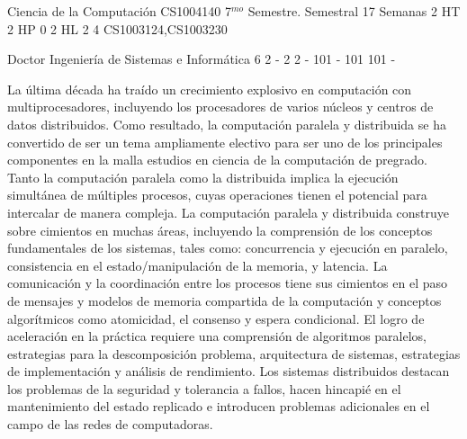 \documentclass[a4paper,8pt]{article}
\begin{document}
\setNombreProfesor{}
\setGradoProfesorAbreviado{}
\sylabusHeader

\academicaTable
{Ciencia de la Computación} %
{CS1004140} %
{7$^{mo}$ Semestre.} %
{Semestral} %
{17 Semanas} %
{2 HT} %
{2 HP} %
{0} %
{2 HL}  %
{2} %
{4} %
{CS1003124,CS1003230} %

\administrativaTable
{Doctor} %
{Ingeniería de Sistemas e Informática} %
{6} %
{2} %
{-} %
{2} %
{2} %
{-} %
{101} %
{-} %
{101} %
{101} %
{-} %


\begin{fundamentacion}
La última década ha traído un crecimiento explosivo en computación con multiprocesadores, incluyendo 
los procesadores de varios núcleos y centros de datos distribuidos. Como resultado, la computación 
paralela y distribuida se ha convertido de ser un tema ampliamente electivo para ser uno de los principales componentes
en la malla estudios en ciencia de la computación de pregrado. Tanto la computación paralela como la distribuida implica 
la ejecución simultánea de múltiples procesos, cuyas operaciones tienen el potencial para 
intercalar de manera compleja. La computación paralela y distribuida construye sobre cimientos en muchas 
áreas, incluyendo la comprensión de los conceptos fundamentales de los sistemas, tales como: concurrencia 
y ejecución en paralelo, consistencia en el estado/manipulación de la memoria, y latencia. La 
comunicación y la coordinación entre los procesos tiene sus cimientos en el paso de mensajes y modelos de 
memoria compartida de la computación y conceptos algorítmicos como atomicidad, el consenso y espera condicional. 
El logro de aceleración en la práctica requiere una comprensión de algoritmos paralelos, estrategias para la 
descomposición problema, arquitectura de sistemas, estrategias de implementación y análisis de 
rendimiento. Los sistemas distribuidos destacan los problemas de la seguridad y tolerancia a 
fallos, hacen hincapié en el mantenimiento del estado replicado e introducen problemas adicionales en el campo de 
las redes de computadoras.

\end{fundamentacion}
\end{document}
